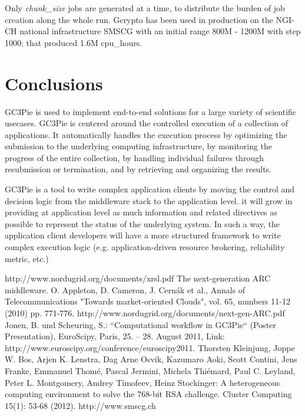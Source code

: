 \documentclass{PoS}
\begin{document}
Only \emph{chunk\_size} jobs are generated at a time, to distribute the
burden of job creation along the whole run.
Gcrypto has been used in production on the NGI-CH national
infrastructure SMSCG \cite{smscg} with an initial range 800M - 1200M
with step 1000; that produced 1.6M cpu\_hours.

\section{Conclusions}
GC3Pie is used to implement end-to-end solutions
for a large variety of scientific usecases. GC3Pie is centered
around the controlled execution of a collection of
applications. It automatically handles the execution process by
optimizing the submission to the underlying computing
infrastructure, by monitoring the progress of the entire
collection, by handling individual failures through resubmission or
termination, and by retrieving and organizing the results.
    
GC3Pie is a tool to write complex
application clients by moving the control and decision
logic from the middleware stack to the application level. it will grow
in providing at application level as much information
and related directives as possible to represent the status of the
underlying system. In such a way, the application client
developers will have a more structured framework to write complex
execution logic (e.g. application-driven resource brokering,
reliability metric, etc.)

\begin{thebibliography}{99}
   http://www.nordugrid.org/documents/xrsl.pdf
   The next-generation ARC middleware. O. Appleton,
    D. Cameron, J. Cernák et al., Annals of Telecommunications
    "Towards market-oriented Clouds", vol. 65, numbers 11-12 (2010)
    pp. 771-776. http://www.nordugrid.org/documents/next-gen-ARC.pdf
   Jonen, B. und Scheuring, S.:
    ``Computational workflow in GC3Pie“ (Poster Presentation),
    EuroScipy, Paris, 25. – 28. August 2011, Link:
    http://www.euroscipy.org/conference/euroscipy2011.
   Thorsten Kleinjung, Joppe W. Bos, Arjen
    K. Lenstra, Dag Arne Osvik, Kazumaro Aoki, Scott Contini, Jens
    Franke, Emmanuel Thomé, Pascal Jermini, Michela Thiémard, Paul
    C. Leyland, Peter L. Montgomery, Andrey Timofeev, Heinz
    Stockinger: A heterogeneous computing environment to solve the
    768-bit RSA challenge. Cluster Computing 15(1): 53-68 (2012).
   http://www.smscg.ch
\end{thebibliography}
\end{document}
